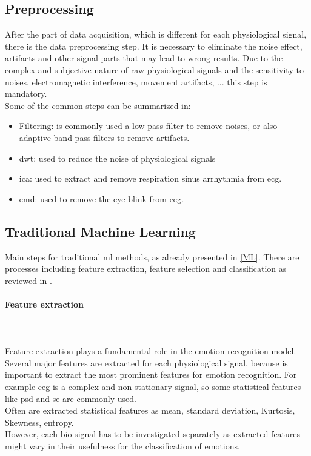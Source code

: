 \subsection{Preprocessing}
After the part of data acquisition, which is different for each physiological signal, there is the data preprocessing step. It is necessary to eliminate the noise effect, artifacts and other signal parts that may lead to wrong results. Due to the complex and subjective nature of raw physiological signals and the sensitivity to noises, electromagnetic interference, movement artifacts, ... this step is mandatory.
\\ \indent
Some of the common steps can be summarized in:
\begin{itemize}
	\item Filtering: is commonly used a low-pass filter to remove noises, or also adaptive band pass filters to remove artifacts.
	\item \gls{dwt}: used to reduce the noise of physiological signals
	\item \gls{ica}: used to extract and remove respiration sinus arrhythmia from \gls{ecg}.
	\item \gls{emd}: used to remove the eye-blink from \gls{eeg}.
\end{itemize}

\subsection{Traditional Machine Learning}
Main steps for traditional \gls{ml} methods, as already presented in \ref{ML}. There are processes including feature extraction, feature selection and classification as reviewed in \cite{jerritta2011physiological}.

\paragraph{Feature extraction}
\mbox{} \\ \\ \indent
Feature extraction plays a fundamental role in the emotion recognition model. Several major features are extracted for each physiological signal, because is important to extract the most prominent features for emotion recognition. For example \gls{eeg} is a complex and non-stationary signal, so some statistical features like \gls{psd} and \gls{se} are commonly used.
\\
Often are extracted statistical features as mean, standard deviation, Kurtosis, Skewness, entropy.
\\
However, each bio-signal has to be investigated separately as extracted features might vary in their usefulness for the classification of emotions.

